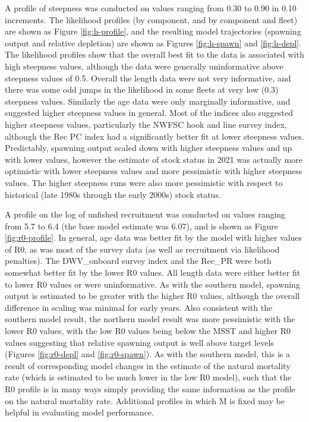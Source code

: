 \documentclass[
  english,
  a4paper,
]{article}
\begin{document}
A profile of steepness was conducted on values ranging from 0.30 to 0.90 in 0.10 increments. The likelihood profiles (by component, and by component and fleet) are shown as Figure \ref{fig:h-profile}, and the resulting model trajectories (spawning output and relative depletion) are shown as Figures \ref{fig:h-spawn} and \ref{fig:h-depl}. The likelihood profiles show that the overall best fit to the data is associated with high steepness values, although the data were generally uninformative above steepness values of 0.5. Overall the length data were not very informative, and there was some odd jumps in the likelihood in some fleets at very low (0.3) steepness values. Similarly the age data were only marginally informative, and suggested higher steepness values in general. Most of the indices also suggested higher steepness values, particularly the NWFSC hook and line survey index, although the Rec PC index had a significantly better fit at lower steepness values. Predictably, spawning output scaled down with higher steepness values and up with lower values, however the estimate of stock status in 2021 was actually more optimistic with lower steepness values and more pessimistic with higher steepness values. The higher steepness runs were also more pessimistic with respect to historical (late 1980s through the early 2000s) stock status.

A profile on the log of unfished recruitment was conducted on values ranging from 5.7 to 6.4 (the base model estimate was 6.07), and is shown as Figure \ref{fig:r0-profile}. In general, age data was better fit by the model with higher values of R0, as was most of the survey data (as well as recruitment via likelihood penalties). The DWV\_onboard survey index and the Rec\_PR were both somewhat better fit by the lower R0 values. All length data were either better fit to lower R0 values or were uninformative. As with the southern model, spawning output is estimated to be greater with the higher R0 values, although the overall difference in scaling was minimal for early years. Also consistent with the southern model result, the northern model result was more pessimistic with the lower R0 values, with the low R0 values being below the MSST and higher R0 values suggesting that relative spawning output is well above target levels (Figures \ref{fig:r0-depl} and \ref{fig:r0-spawn}). As with the southern model, this is a result of corresponding model changes in the estimate of the natural mortality rate (which is estimated to be much lower in the low R0 model), such that the R0 profile is in many ways simply providing the same information as the profile on the natural mortality rate. Additional profiles in which M is fixed may be helpful in evaluating model performance.
\end{document}
